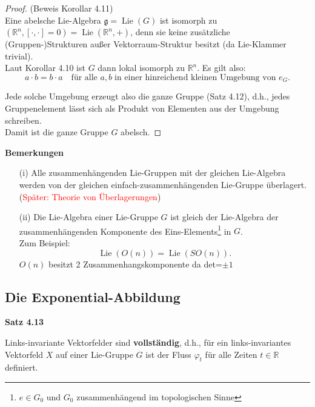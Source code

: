 \documentclass[fleqn, 12pt, letterpaper]{article}
\newcommand{\txt}[1]{\text{#1}}
\begin{document}
\begin{proof}
    (Beweis Korollar 4.11)\\
    Eine abelsche Lie-Algebra \( \mathfrak{g} = \operatorname{Lie}(G) \) ist isomorph zu \( (\mathbb{R}^n, [\cdot, \cdot] = 0) = \operatorname{Lie}(\mathbb{R}^n, +) \), denn sie keine zusätzliche (Gruppen-)Strukturen außer Vektorraum-Struktur besitzt (da Lie-Klammer trivial).\\

Laut Korollar 4.10 ist $G$ dann lokal isomorph zu $\mathbb{R}^n$. Es gilt also:
\[
a\cdot b=b\cdot a \quad \text{für alle } a, b \;\txt{in einer hinreichend kleinen Umgebung von } e_G.
\]

Jede solche Umgebung erzeugt also die ganze Gruppe (Satz 4.12), d.h., jedes Gruppenelement lässt sich als Produkt von Elementen aus der Umgebung schreiben. \\

Damit ist die ganze Gruppe \( G \) abelsch.
\end{proof}

\textbf{Bemerkungen}

\begin{itemize}
    \item[(i)] Alle zusammenhängenden Lie-Gruppen mit der gleichen Lie-Algebra werden von der gleichen einfach-zusammenhängenden Lie-Gruppe überlagert. \\
    (\textcolor{red}{Später: Theorie von Überlagerungen})

    \item[(ii)] Die Lie-Algebra einer Lie-Gruppe \( G \) ist gleich der Lie-Algebra der {zusammenhängenden Komponente des Eins-Elements}\footnote{$e\in G_0$ und $G_0$ zusammenhängend im topologischen Sinne} in \( G \). \\
    Zum Beispiel:
    \[
    \operatorname{Lie}(O(n)) = \operatorname{Lie}(SO(n)).
    \]
    $O(n)$ besitzt 2 Zusammenhangskomponente da det=$\pm 1$
\end{itemize}

\subsection{Die Exponential-Abbildung}

\textbf{Satz 4.13}

Links-invariante Vektorfelder sind \textbf{vollständig}, d.h., für ein links-invariantes Vektorfeld \( X \) auf einer Lie-Gruppe \( G \) ist der Fluss \( \varphi_t \) für alle Zeiten \( t \in \mathbb{R} \) definiert. \\
\end{document}
